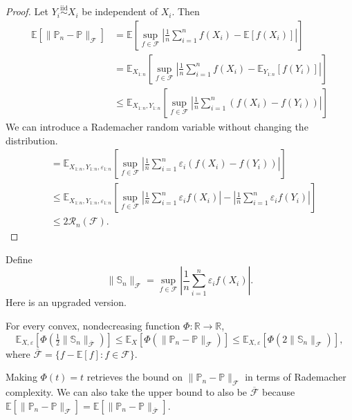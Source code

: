 \begin{proof}
Let $Y_i \overset{\text{iid}}{\sim} X_i$ be independent of $X_i$. Then
\begin{align*}
\mathbb{E}[\|\mathbb{P}_n - \mathbb{P}\|_{\mathcal{F}}] &= \mathbb{E} \left[ \sup_{f \in \mathcal{F}} \left| \frac{1}{n} \sum_{i=1}^n f(X_i) - \mathbb{E}[f(X_i)] \right| \right] \\
&= \mathbb{E}_{X_{1:n}} \left[ \sup_{f \in \mathcal{F}} \left| \frac{1}{n} \sum_{i=1}^n f(X_i) - \mathbb{E}_{Y_{1:n}}[f(Y_i)] \right| \right] \\
&\leq \mathbb{E}_{X_{1:n}, Y_{1:n}} \left[ \sup_{f \in \mathcal{F}} \left| \frac{1}{n} \sum_{i=1}^n (f(X_i) - f(Y_i)) \right| \right]
\end{align*}
We can introduce a Rademacher random variable without changing the distribution.
\begin{align*}
&= \mathbb{E}_{X_{1:n}, Y_{1:n}, \varepsilon_{1:n}} \left[ \sup_{f \in \mathcal{F}} \left| \frac{1}{n} \sum_{i=1}^n \varepsilon_i (f(X_i) - f(Y_i)) \right| \right] \\
&\leq \mathbb{E}_{X_{1:n}, Y_{1:n}, \varepsilon_{1:n}} \left[ \sup_{f \in \mathcal{F}} \left| \frac{1}{n} \sum_{i=1}^n \varepsilon_i f(X_i) \right| - \left| \frac{1}{n} \sum_{i=1}^n \varepsilon_i f(Y_i) \right| \right] \\
&\leq 2\mathcal{R}_n(\mathcal{F}).
\end{align*}
\end{proof}
Define
\[
\|\mathbb{S}_n\|_{\mathcal{F}} = \sup_{f \in \mathcal{F}} \left| \frac{1}{n} \sum_{i=1}^n \varepsilon_i f(X_i) \right|.
\]
Here is an upgraded version.

\begin{prop}
For every convex, nondecreasing function $\Phi : \mathbb{R} \to \mathbb{R}$,
\[
\mathbb{E}_{X, \varepsilon}\left[\Phi\left(\tfrac{1}{2} \|\mathbb{S}_n\|_{\overline{\mathcal{F}}}\right)\right] \leq \mathbb{E}_X[\Phi(\|\mathbb{P}_n - \mathbb{P}\|_{\mathcal{F}})] \leq \mathbb{E}_{X, \varepsilon}[\Phi(2\|\mathbb{S}_n\|_{\mathcal{F}})],
\]
where $\overline{\mathcal{F}} = \{f - \mathbb{E}[f] : f \in \mathcal{F}\}$.
\end{prop}

\begin{rem}
Making $\Phi(t) = t$ retrieves the bound on $\|\mathbb{P}_n - \mathbb{P}\|_{\mathcal{F}}$ in terms of Rademacher complexity. We can also take the upper bound to also be $\overline{\mathcal{F}}$ because $\mathbb{E}[\|\mathbb{P}_n - \mathbb{P}\|_{\mathcal{F}}] = \mathbb{E}[\|\mathbb{P}_n - \mathbb{P}\|_{\overline{\mathcal{F}}}]$.
\end{rem}

